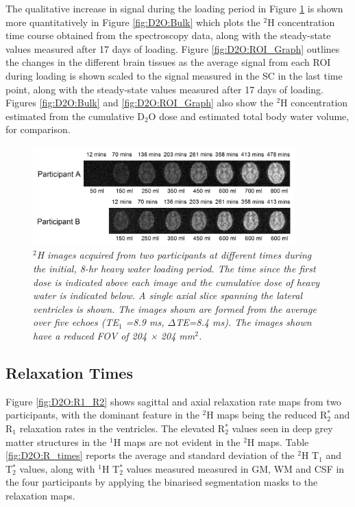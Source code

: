 \documentclass[class=article, crop=false]{standalone}
\begin{document}
The qualitative increase in signal during the loading period in Figure \ref{fig:D2O:Load} is shown more quantitatively in Figure \ref{fig:D2O:Bulk} which plots the $^2$H concentration time course obtained from the spectroscopy data, along with the steady-state values measured after 17 days of loading. Figure \ref{fig:D2O:ROI_Graph} outlines the changes in the different brain tissues as the average signal from each ROI during loading is shown scaled to the signal measured in the SC in the last time point, along with the steady-state values measured after 17 days of loading. Figures \ref{fig:D2O:Bulk} and \ref{fig:D2O:ROI_Graph} also show the $^2$H concentration estimated from the cumulative D$_2$O dose and estimated total body water volume, for comparison. 

\begin{figure}[H]
    \centering
    \includegraphics[width=0.9\textwidth]{Figures/D2O/Loading.png}
    \caption{\textit{$^2$H images acquired from two participants at different times during the initial, 8-hr heavy water loading period. The time since the first dose is indicated above each image and the cumulative dose of heavy water is indicated below. A single axial slice spanning the lateral ventricles is shown. The images shown are formed from the average over five echoes (TE$_1$ =8.9 ms, $\Delta$TE=8.4 ms). The images shown have a reduced FOV of 204 × 204 mm$^2$.}}
    \label{fig:D2O:Load}
\end{figure}

\subsection{Relaxation Times}

Figure \ref{fig:D2O:R1_R2} shows sagittal and axial relaxation rate maps from two participants, with the dominant feature in the $^2$H maps being the reduced R$_2^*$ and R$_1$ relaxation rates in the ventricles. The elevated R$_2^*$ values seen in deep grey matter structures in the $^1$H maps are not evident in the $^2$H maps. Table \ref{fig:D2O:R_times} reports the average and standard deviation of the $^2$H T$_1$ and T$_2^*$ values, along with $^1$H T$_2^*$ values measured measured in GM, WM and CSF in the four participants by applying the binarised segmentation masks to the relaxation maps.
\end{document}
